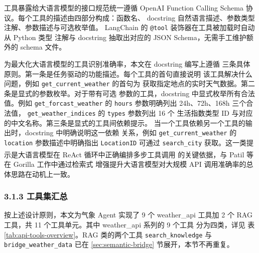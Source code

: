 \documentclass[a4paper]{article}
\theoremstyle{definition}
\theoremstyle{plain}
\theoremstyle{remark}
\newcommand{\reftab}[1]{表 \ref{#1}}
\let\oldcite\cite
\renewcommand{\cite}[1]{\textsuperscript{\oldcite{#1}}}
\newcommand{\bk}{\discretionary{}{}{}}
\begin{document}
工具暴露给大语言模型的接口规范统一遵循 OpenAI Function Calling
Schema 协议。每个工具的描述由四部分构成：函数名、
docstring 自然语言描述、参数类型注解、参数描述与可选枚举值。
LangChain 的 \texttt{@tool} 装饰器在工具被加载时自动从 Python 类型
注解与 docstring 抽取出对应的 JSON Schema，无需手工维护额外的
schema 文件。

为最大化大语言模型的工具识别准确率，本文在 docstring 编写上遵循
三条具体原则。第一条是任务驱动的功能描述。每个工具的首句直接说明
该工具解决什么问题，例如 \texttt{get\_\bk{}current\_\bk{}weather} 的首句为
获取指定地点的实时天气数据。第二条是显式的参数枚举。对于带有可选
参数的工具，docstring 中显式枚举所有合法值。例如 \texttt{get\_\bk{}forcast\_\bk{}weather}
的 \texttt{hours} 参数明确列出 24h、72h、168h 三个合法值，
\texttt{get\_\bk{}weather\_\bk{}indices} 的 \texttt{types} 参数列出 16 个
生活指数类型 ID 与对应的中文名称。第三条是显式的工具间依赖提示。
当一个工具依赖另一个工具的输出时，docstring 中明确说明这一依赖
关系，例如 \texttt{get\_\bk{}current\_\bk{}weather} 的 \texttt{location}
参数描述中明确指出 \texttt{LocationID} 可通过 \texttt{search\_\bk{}city}
获取。这一类提示是大语言模型在 ReAct 循环中正确编排多步工具调用
的关键依据，与 Patil 等 \cite{ref28} 在 Gorilla 工作中通过检索式
增强提升大语言模型对大规模 API 调用准确率的总体思路在动机上一致。

\subsubsection*{3.1.3 \quad 工具集汇总}

按上述设计原则，本文为气象 Agent 实现了 9 个 weather\_api 工具加
2 个 RAG 工具，共 11 个工具单元。其中 weather\_api 系列的 9 个工具
分为四类，详见 \reftab{tab:api-tools-overview}。RAG 类的两个工具
\texttt{search\_\bk{}knowledge} 与 \texttt{bridge\_\bk{}weather\_\bk{}data} 已在
\ref{sec:semantic-bridge} 节展开，本节不再重复。
\end{document}
